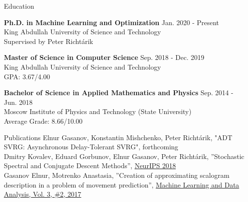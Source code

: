 \documentclass{resume} %
\begin{document}

\begin{rSection}{Education}

{\bf Ph.D. in Machine Learning and Optimization} \hfill {Jan. 2020 - Present}
\\ 
King Abdullah University of Science and Technology
\\
Supervised by Peter Richt{\'a}rik


{\bf Master of Science in Computer Science} \hfill {Sep. 2018 - Dec. 2019 }
\\ 
King Abdullah University of Science and Technology
\\
GPA: 3.67/4.00

{\textbf{Bachelor of Science in Applied Mathematics and Physics}}  \hfill {Sep. 2014 - Jun. 2018}
\\
Moscow Institute of Physics and Technology (State University)
\\ 
Average Grade: 8.66/10.00

\end{rSection}



\begin{rSection}{Publications}
{Elnur Gasanov, Konstantin Mishchenko, Peter Richt{\'a}rik, "ADT SVRG: Asynchronous Delay-Tolerant SVRG", forthcoming}\\
{Dmitry Kovalev, Eduard Gorbunov, Elnur Gasanov, Peter Richt{\'a}rik, ”Stochastic Spectral and Conjugate Descent Methods”, \href{https://papers.nips.cc/paper/7596-stochastic-spectral-and-conjugate-descent-methods}{NeurIPS 2018}}\\
{Gasanov Elnur, Motrenko Anastasia, ”Creation of approximating scalogram description in a problem of movement prediction”, \href{http://jmlda.org/papers/doc/2017/no2/Gasanov2017ECoGAnalysis.pdf}{Machine Learning and Data Analysis, Vol. 3, \#2, 2017}}
	
\end{rSection}

\end{document}
